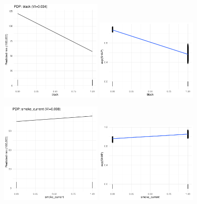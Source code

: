 \documentclass[12pt]{article}
\begin{document}
\begin{figure}[h]
\centering
\includegraphics[width=0.45\textwidth]{figures/pdp_new/black.pdf}
\includegraphics[width=0.45\textwidth]{figures/shap_new/black.pdf}
\end{figure}
\begin{figure}[h]
\centering
\includegraphics[width=0.45\textwidth]{figures/pdp_new/smoke_current.pdf}
\includegraphics[width=0.45\textwidth]{figures/shap_new/smoke_current.pdf}
\end{figure}
\end{document}

